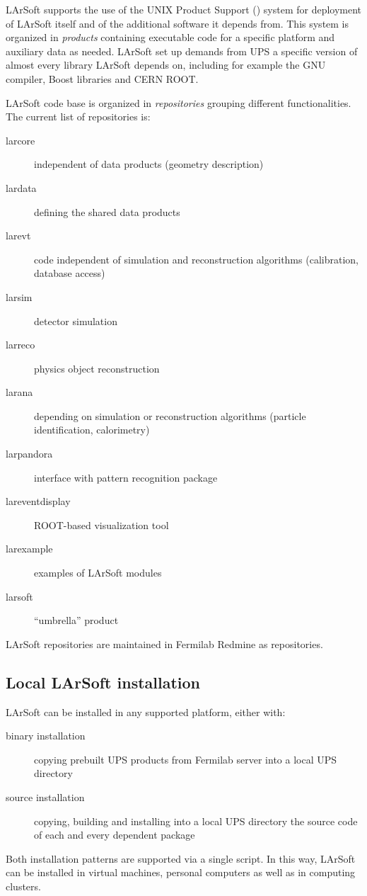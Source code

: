 
LArSoft supports the use of the UNIX Product Support (\UPS) system
for deployment of LArSoft itself and of the additional software it depends from.
This system is organized in \emph{products} containing executable code for a specific platform
and auxiliary data as needed.
LArSoft set up demands from UPS a specific version of almost every library LArSoft depends on,
including for example the GNU compiler, Boost libraries and CERN ROOT.

LArSoft code base is organized in \emph{repositories} grouping different functionalities.
The current list of repositories is:
\begin{description}
   \item[larcore] independent of data products (\eg geometry description)
   \item[lardata] defining the shared data products
   \item[larevt] code independent of simulation and reconstruction algorithms (\eg calibration, database access)
   \item[larsim] detector simulation
   \item[larreco] physics object reconstruction
   \item[larana] depending on simulation or reconstruction algorithms (\eg particle identification, calorimetry)
   \item[larpandora] interface with pattern recognition package \Pandora
   \item[lareventdisplay] ROOT-based visualization tool
   \item[larexample] examples of LArSoft modules
   \item[larsoft] ``umbrella'' product
\end{description}
LArSoft repositories are maintained in Fermilab Redmine as \git repositories.


\subsection{Local LArSoft installation}
\label{ssec:Repositories:LocalInstallation}

LArSoft can be installed in any supported platform, either with:
\begin{description}
   \item[binary installation] copying prebuilt UPS products from Fermilab server
      into a local UPS directory
   \item[source installation] copying, building and installing into a local UPS directory
      the source code of each and every dependent package
\end{description}
Both installation patterns are supported via a single script.
In this way, LArSoft can be installed in virtual machines, personal computers
as well as in computing clusters.
